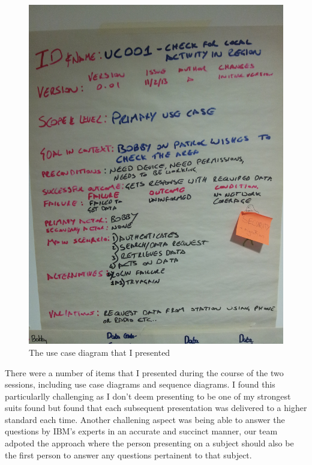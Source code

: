 \documentclass[12pt]{article} %
\begin{document}
\begin{figure}
\begin{center}
\includegraphics[width=\linewidth, angle=-90]{use-case}
\parbox{0.90\linewidth}{\caption{The use case diagram that I presented}}
\end{center}
\end{figure}

There were a number of items that I presented during the course of the two sessions, including use case diagrams and sequence diagrams. I found this particularlly challenging as I don't deem presenting to be one of my strongest suits found but found that each subsequent presentation was delivered to a higher standard each time. Another challening aspect was being able to answer the questions by IBM's experts in an accurate and succinct manner, our team adpoted the approach where the person presenting on a subject should also be the first person to answer any questions pertainent to that subject.
\end{document}
